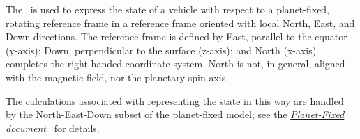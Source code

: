 %
%
% 
%


The \NEDDesc\ is used to express the state of a vehicle with respect to a planet-fixed, rotating reference frame in a reference frame oriented with local North, East, and Down directions.  The reference frame is defined by East, parallel to the equator (y-axis); Down, perpendicular to the surface (z-axis); and North (x-axis) completes the right-handed coordinate system.  North is not, in general, aligned with the magnetic field, nor the planetary spin axis.

The calculations associated with representing the state in this way are handled by the North-East-Down subset of the planet-fixed model;  see the \href{file:\JEODHOME/models/utils/planet_fixed/docs/planet_fixed.pdf}{\em Planet-Fixed document}~\cite{dynenv:PLANETFIXED} for details.
